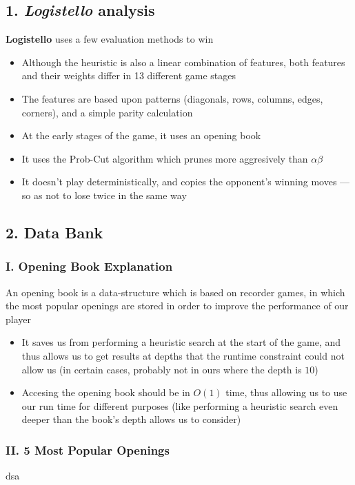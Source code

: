 \documentclass{article}
\begin{document}
\subsection*{1. \emph{Logistello} analysis}
\textbf{Logistello} uses a few evaluation methods to win
\begin{itemize}
\item Although the heuristic is also a linear combination of features, both features and their weights differ in 13 different game stages
\item The features are based upon patterns (diagonals, rows, columns, edges, corners), and a simple parity calculation
\item At the early stages of the game, it uses an opening book
\item It uses the Prob-Cut algorithm which prunes more aggresively than $\alpha\beta$
\item It doesn't play deterministically, and copies the opponent's winning moves --- so as not to lose twice in the same way
\end{itemize}

\subsection*{2. Data Bank}
\subsubsection*{I. Opening Book Explanation}
An opening book is a data-structure which is based on recorder games, in which the most popular openings are stored in order to improve the performance of our player 
\begin{itemize}
\item It saves us from performing a heuristic search at the start of the game, and thus allows us to get results at depths that the runtime constraint could not allow us (in certain cases, probably not in ours where the depth is $10$)	
\item Accesing the opening book should be in $O(1)$ time, thus allowing us to use our run time for different purposes (like performing a heuristic search even deeper than the book's depth allows us to consider)
\end{itemize}

\subsubsection*{II. 5 Most Popular Openings}
dsa
\end{document}
